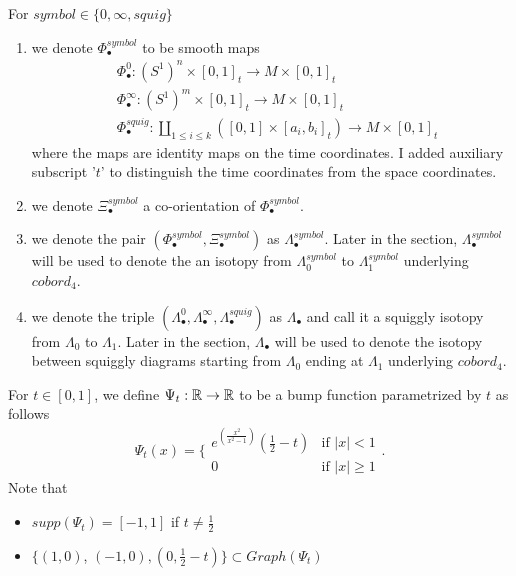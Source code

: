\begin{definition}
For $symbol\in\{0,\infty, squig \}$
\begin{enumerate}
\item we denote $\Phi_\bullet^{symbol}$ to be smooth maps
\begin{align*}
&\Phi_\bullet^0 : (S^1)^n \times [0,1]_t \rightarrow M \times [0,1]_t \\
&\Phi_\bullet^\infty : (S^1)^m \times [0,1]_t \rightarrow M \times [0,1]_t \\
&\Phi_\bullet^{squig} : \coprod_{1\leq i \leq k} ([0,1] \times [a_i,b_i]_t) \rightarrow M \times [0,1]_t
\end{align*}
where the maps are identity maps on the time coordinates. I added auxiliary subscript '$t$' to distinguish the time coordinates from the space coordinates.

\item we denote $\Xi_\bullet^{symbol}$ a co-orientation of $\Phi_\bullet^{symbol}$.

\item we denote the pair $(\Phi_\bullet^{symbol},\Xi_\bullet^{symbol})$ as $\Lambda_\bullet^{symbol}$. Later in the section, $\Lambda_\bullet^{symbol}$ will be used to denote the an isotopy from $\Lambda_0^{symbol}$ to $\Lambda_1^{symbol}$ underlying $cobord_4$.

\item we denote the triple $(\Lambda_\bullet^{0},\Lambda_\bullet^{\infty},\Lambda_\bullet^{squig})$ as $\Lambda_\bullet$ and call it a squiggly isotopy from $\Lambda_0$ to $\Lambda_1$. Later in the section, $\Lambda_\bullet$ will be used to denote the isotopy between squiggly diagrams starting from $\Lambda_0$ ending at $\Lambda_1$ underlying $cobord_4$.
\end{enumerate}
\end{definition}

\begin{definition}
For $t \in [0,1]$, we define $\Psi_t: \mathbb{R} \rightarrow \mathbb{R}$ to be a bump function parametrized by $t$ as follows
\[\Psi_t(x)=\bigg\{
\begin{array}{ll}
    e^{(\frac{x^2}{x^2 - 1})}(\frac{1}{2}-t) & \text{if } |x| < 1 \\
    0 & \text{if } |x| \geq 1
\end{array}
\bigg.
\]
Note that 
\begin{itemize}
\item $supp(\Psi_t) = [-1,1]$ if $t\neq \frac{1}{2}$

\item $\{(1,0)$, $(-1,0),(0, \frac{1}{2}-t)\} \subset Graph(\Psi_t)$
\end{itemize}
\end{definition}

